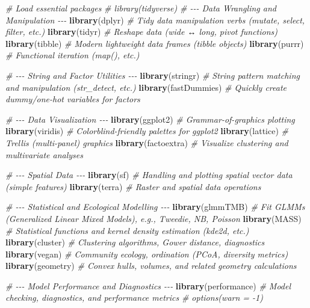 \documentclass[
]{article}
\newenvironment{Shaded}{\begin{snugshade}}{\end{snugshade}}
\newcommand{\CommentTok}[1]{\textcolor[rgb]{0.56,0.35,0.01}{\textit{#1}}}
\newcommand{\FunctionTok}[1]{\textcolor[rgb]{0.13,0.29,0.53}{\textbf{#1}}}
\newcommand{\NormalTok}[1]{#1}
\begin{document}
\begin{Shaded}
\begin{Highlighting}[]
\CommentTok{\# Load essential packages}
\CommentTok{\# library(tidyverse)}
\CommentTok{\# {-}{-}{-} Data Wrangling and Manipulation {-}{-}{-}}
\FunctionTok{library}\NormalTok{(dplyr)       }\CommentTok{\# Tidy data manipulation verbs (mutate, select, filter, etc.)}
\FunctionTok{library}\NormalTok{(tidyr)       }\CommentTok{\# Reshape data (wide ↔ long, pivot functions)}
\FunctionTok{library}\NormalTok{(tibble)      }\CommentTok{\# Modern lightweight data frames (tibble objects)}
\FunctionTok{library}\NormalTok{(purrr)       }\CommentTok{\# Functional iteration (map(), etc.)}

\CommentTok{\# {-}{-}{-} String and Factor Utilities {-}{-}{-}}
\FunctionTok{library}\NormalTok{(stringr)     }\CommentTok{\# String pattern matching and manipulation (str\_detect, etc.)}
\FunctionTok{library}\NormalTok{(fastDummies) }\CommentTok{\# Quickly create dummy/one{-}hot variables for factors}

\CommentTok{\# {-}{-}{-} Data Visualization {-}{-}{-}}
\FunctionTok{library}\NormalTok{(ggplot2)     }\CommentTok{\# Grammar{-}of{-}graphics plotting}
\FunctionTok{library}\NormalTok{(viridis)     }\CommentTok{\# Colorblind{-}friendly palettes for ggplot2}
\FunctionTok{library}\NormalTok{(lattice)     }\CommentTok{\# Trellis (multi{-}panel) graphics}
\FunctionTok{library}\NormalTok{(factoextra)  }\CommentTok{\# Visualize clustering and multivariate analyses}

\CommentTok{\# {-}{-}{-} Spatial Data {-}{-}{-}}
\FunctionTok{library}\NormalTok{(sf)          }\CommentTok{\# Handling and plotting spatial vector data (simple features)}
\FunctionTok{library}\NormalTok{(terra)       }\CommentTok{\# Raster and spatial data operations}

\CommentTok{\# {-}{-}{-} Statistical and Ecological Modelling {-}{-}{-}}
\FunctionTok{library}\NormalTok{(glmmTMB)     }\CommentTok{\# Fit GLMMs (Generalized Linear Mixed Models), e.g., Tweedie, NB, Poisson}
\FunctionTok{library}\NormalTok{(MASS)        }\CommentTok{\# Statistical functions and kernel density estimation (kde2d, etc.)}
\FunctionTok{library}\NormalTok{(cluster)     }\CommentTok{\# Clustering algorithms, Gower distance, diagnostics}
\FunctionTok{library}\NormalTok{(vegan)       }\CommentTok{\# Community ecology, ordination (PCoA, diversity metrics)}
\FunctionTok{library}\NormalTok{(geometry)    }\CommentTok{\# Convex hulls, volumes, and related geometry calculations}

\CommentTok{\# {-}{-}{-} Model Performance and Diagnostics {-}{-}{-}}
\FunctionTok{library}\NormalTok{(performance) }\CommentTok{\# Model checking, diagnostics, and performance metrics}
\CommentTok{\# options(warn = {-}1)}
\end{Highlighting}
\end{Shaded}
\end{document}
